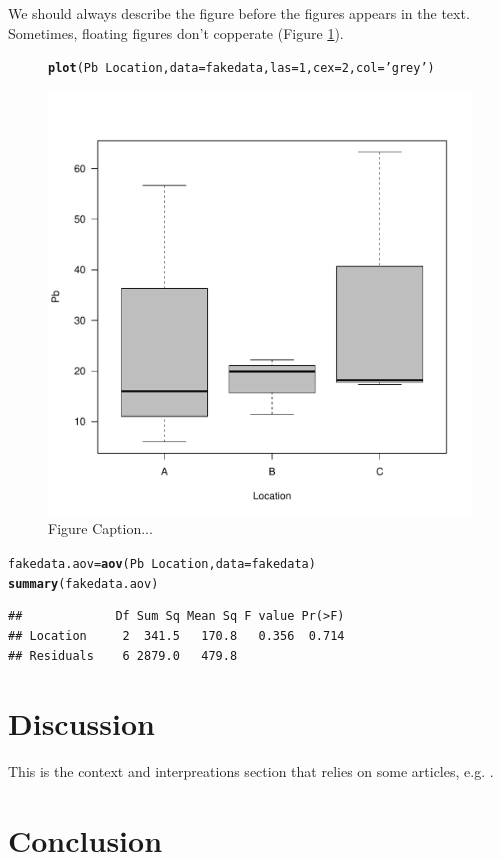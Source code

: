 \documentclass{article}\usepackage[]{graphicx}\usepackage[]{color}
\makeatletter
\def\maxwidth{ %
  \ifdim\Gin@nat@width>\linewidth
    \linewidth
  \else
    \Gin@nat@width
  \fi
}
\newcommand{\hlnum}[1]{\textcolor[rgb]{0.686,0.059,0.569}{#1}}%
\newcommand{\hlstr}[1]{\textcolor[rgb]{0.192,0.494,0.8}{#1}}%
\newcommand{\hlopt}[1]{\textcolor[rgb]{0,0,0}{#1}}%
\newcommand{\hlstd}[1]{\textcolor[rgb]{0.345,0.345,0.345}{#1}}%
\newcommand{\hlkwb}[1]{\textcolor[rgb]{0.69,0.353,0.396}{#1}}%
\newcommand{\hlkwc}[1]{\textcolor[rgb]{0.333,0.667,0.333}{#1}}%
\newcommand{\hlkwd}[1]{\textcolor[rgb]{0.737,0.353,0.396}{\textbf{#1}}}%
\newenvironment{kframe}{%
 \def\at@end@of@kframe{}%
 \ifinner\ifhmode%
  \def\at@end@of@kframe{\end{minipage}}%
  \begin{minipage}{\columnwidth}%
 \fi\fi%
 \def\FrameCommand##1{\hskip\@totalleftmargin \hskip-\fboxsep
 \colorbox{shadecolor}{##1}\hskip-\fboxsep
     \hskip-\linewidth \hskip-\@totalleftmargin \hskip\columnwidth}%
 \MakeFramed {\advance\hsize-\width
   \@totalleftmargin\z@ \linewidth\hsize
   \@setminipage}}%
 {\par\unskip\endMakeFramed%
 \at@end@of@kframe}
\newenvironment{knitrout}{}{} %
\makeatother
\begin{document}
We should always describe the figure before the figures appears in the text. Sometimes, floating figures don't copperate (Figure \ref{fig.boxplot}).


\begin{figure}
\begin{knitrout}
\color{fgcolor}\begin{kframe}
\begin{alltt}
\hlkwd{plot}\hlstd{(Pb} \hlopt{~} \hlstd{Location,} \hlkwc{data}\hlstd{=fakedata,} \hlkwc{las}\hlstd{=}\hlnum{1}\hlstd{,} \hlkwc{cex}\hlstd{=}\hlnum{2}\hlstd{,} \hlkwc{col}\hlstd{=}\hlstr{'grey'}\hlstd{)}
\end{alltt}
\end{kframe}
\includegraphics[width=\maxwidth]{figure/boxplot-1} 

\end{knitrout}
\caption{Figure Caption...}
\label{fig.boxplot}
\end{figure}
\begin{knitrout}
\color{fgcolor}\begin{kframe}
\begin{alltt}
\hlstd{fakedata.aov} \hlkwb{=} \hlkwd{aov}\hlstd{(Pb} \hlopt{~} \hlstd{Location,} \hlkwc{data}\hlstd{=fakedata)}
\hlkwd{summary}\hlstd{(fakedata.aov)}
\end{alltt}
\begin{verbatim}
##             Df Sum Sq Mean Sq F value Pr(>F)
## Location     2  341.5   170.8   0.356  0.714
## Residuals    6 2879.0   479.8
\end{verbatim}
\end{kframe}
\end{knitrout}
\section{Discussion}

This is the context and interpreations section that relies on some articles, e.g. \cite{struzynska2005role}.
\section{Conclusion}


\end{document}
